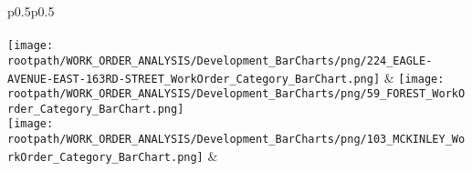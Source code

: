 \begin{center}
                                \tablehead{\hspace{1cm}\\}
                                \tabletail{\hspace{1cm}\\}
                                \begin{supertabular}{p{0.5\textwidth}p{0.5\textwidth}}
                                \shrinkheight{1in}
                                 \\
                                 \\
                                \texttt{[image: \\rootpath/WORK\_ORDER\_ANALYSIS/Development\_BarCharts/png/224\_EAGLE-AVENUE-EAST-163RD-STREET\_WorkOrder\_Category\_BarChart.png]} & \texttt{[image: \\rootpath/WORK\_ORDER\_ANALYSIS/Development\_BarCharts/png/59\_FOREST\_WorkOrder\_Category\_BarChart.png]} \\
                                        \texttt{[image: \\rootpath/WORK\_ORDER\_ANALYSIS/Development\_BarCharts/png/103\_MCKINLEY\_WorkOrder\_Category\_BarChart.png]} &  \hspace{1cm} \\
                                        \end{supertabular}
\end{center}

